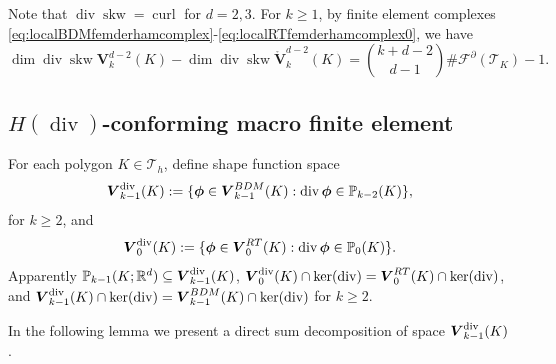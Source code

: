 \documentclass[10pt]{amsart}
\newcommand{\curl}{\operatorname{curl}}
\renewcommand{\div}{\operatorname{div}}
\newcommand{\skw}{\operatorname{skw}}
\numberwithin{equation}{section}
\begin{document}
Note that $\div\skw=\curl$ for $d=2,3$.
For $k\geq1$, by finite element complexes \eqref{eq:localBDMfemderhamcomplex}-\eqref{eq:localRTfemderhamcomplex0}, we have
\begin{equation}\label{eq:20220324-4}
\dim\div\skw\boldsymbol{V}_{k}^{d-2}(K)-\dim\div\skw\mathring{\boldsymbol{V}}_{k}^{d-2}(K)={k+d-2\choose d-1}\#\mathcal F^{\partial}(\mathcal T_K)-1.
\end{equation}

\subsection{$H(\div)$-conforming macro finite element}
For each polygon $K\in \mathcal T_h$, 
define shape function space
\[
\boldsymbol{V}_{k-1}^{\rm div}(K):=\{\boldsymbol{\phi}\in\boldsymbol{V}_{k-1}^{BDM}(K): \div\boldsymbol{\phi}\in\mathbb P_{k-2}(K)\},
\]
for $k\geq 2$, and 
\[
\boldsymbol{V}_{0}^{\rm div}(K):=\{\boldsymbol{\phi}\in\boldsymbol{V}_{0}^{RT}(K): \div\boldsymbol{\phi}\in\mathbb P_{0}(K)\}.
\]
Apparently $\mathbb P_{k-1}(K;\mathbb R^d)\subseteq\boldsymbol{V}_{k-1}^{\rm div}(K)$, $\boldsymbol{V}_{0}^{\rm div}(K)\cap\ker(\div)=\boldsymbol{V}_0^{RT}(K)\cap\ker(\div)$, and $\boldsymbol{V}_{k-1}^{\rm div}(K)\cap\ker(\div)=\boldsymbol{V}_{k-1}^{BDM}(K)\cap\ker(\div)$ for $k\geq2$.


In the following lemma we present a direct sum decomposition of space $\boldsymbol{V}_{k-1}^{\rm div}(K)$.
\end{document}
